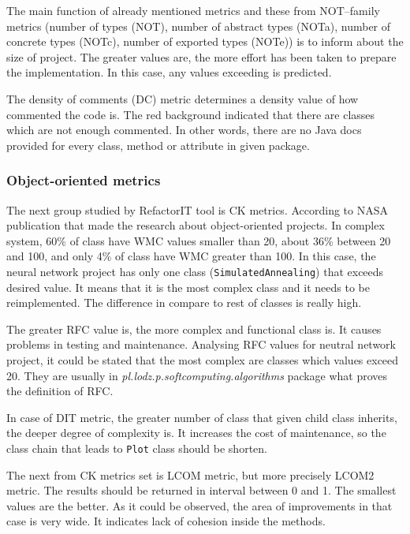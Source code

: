 The main function of already mentioned metrics and these from NOT--family metrics (number of types (\ac{NOT}), number of abstract types (\ac{NOTa}), number of concrete types (\ac{NOTc}), number of exported types (\ac{NOTe})) is to inform about the size of project. The greater values are, the more effort has been taken to prepare the implementation. In this case, any values exceeding is predicted. 

The density of comments (\ac{DC}) metric determines a density value of how commented the code is. The red background indicated that there are classes which are not enough commented. In other words, there are no Java docs provided for every class, method or attribute in given package.

\subsubsection*{Object-oriented metrics}
The next group studied by RefactorIT tool is \ac{CK metrics}. According to NASA publication \cite{nasa} that made the research about object-oriented projects. In complex system, 60\% of class have \ac{WMC} values smaller than 20, about 36\% between 20 and 100, and only 4\% of class have \ac{WMC} greater than 100. In this case, the neural network project has only one class (\texttt{SimulatedAnnealing}) that exceeds desired value. It means that it is the most complex class and it needs to be reimplemented. The difference in compare to rest of classes is really high. 

The greater \ac{RFC} value is, the more complex and functional class is. It causes problems in testing and maintenance. Analysing \ac{RFC} values for neutral network project, it could be stated that the most complex are classes which values exceed 20. They are usually in \textit{pl.lodz.p.softcomputing.algorithms} package what proves the definition of \ac{RFC}.       

In case of \ac{DIT} metric, the greater number of class that given child class inherits, the deeper degree of complexity is. It increases the cost of maintenance, so the class chain that leads to \texttt{Plot} class should be shorten. 

The next from \ac{CK metrics} set is \ac{LCOM} metric, but more precisely LCOM2 metric. The results should be returned in interval between 0 and 1. The smallest values are the better. As it could be observed, the area of improvements in that case is very wide. It indicates lack of cohesion inside the methods.  

